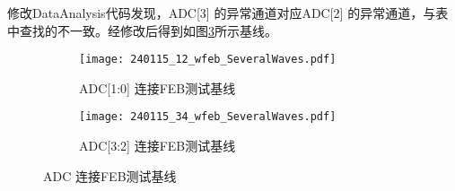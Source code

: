 修改DataAnalysis代码发现，ADC[3] 的异常通道对应ADC[2] 的异常通道，与表中查找的不一致。经修改后得到如图\ref{fig:ADC_wfeb}所示基线。\par
\begin{figure}[htbp]
  \centering
  \begin{subfigure}[b]{0.45\textwidth}
    \texttt{[image: 240115\_12\_wfeb\_SeveralWaves.pdf]}
    \caption{ADC[1:0] 连接FEB测试基线}
    \label{fig:adc12_wfeb}
  \end{subfigure}
  \hfill
  \begin{subfigure}[b]{0.45\textwidth}
    \texttt{[image: 240115\_34\_wfeb\_SeveralWaves.pdf]}
    \caption{ADC[3:2] 连接FEB测试基线}
    \label{fig:adc34_wfeb2}
  \end{subfigure}
  \caption{ADC 连接FEB测试基线}
  \label{fig:ADC_wfeb}
\end{figure}

